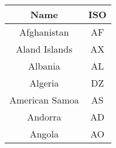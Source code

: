 \begin{tabular}{|c|c|}
\hline
Name & ISO \\
\hline
Afghanistan & AF \\
Aland Islands & AX \\
Albania    &AL  \\
Algeria   &DZ \\
American Samoa & AS \\
Andorra & AD   \\
Angola & AO \\
\hline
\end{tabular}

